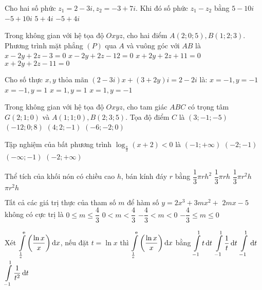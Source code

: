 \begin{ex}%
Cho hai số phức $z_1=2-3 i, z_2=-3+7 i$. Khi đó số phức $z_1-z_2$ bằng
\choice
{\True $5-10 i$}
{$-5+10 i$}
{$5+4 i$}
{$-5+4 i$}

\end{ex}
\begin{ex}%
Trong không gian với hệ tọa độ $O x y z$, cho hai điểm $A(2; 0; 5), B(1; 2; 3)$.
Phương trình mặt phẳng $(P)$ qua $A$ và vuông góc với $AB$ là
\choice
{$x-2 y+2 z-3=0$}
{\True $x-2 y+2 z-12=0$}
{$x+2 y+2 z+11=0$}
{$x+2 y+2 z-11=0$}

\end{ex}
\begin{ex}%
Cho số thực $x, y$ thỏa mãn $(2-3 i) x+(3+2 y) i=2-2 i$ là:
\choice
{$x=-1, y=-1$}
{$x=-1, y=1$}
{$x=1, y=1$}
{\True $x=1, y=-1$}

\end{ex}
\begin{ex}%
Trong không gian với hệ tọa độ $O x y z$, cho tam giác $ABC$ có trọng tâm $G(2; 1; 0)$ và $A(1; 1; 0), B(2; 3; 5)$. Tọa độ điểm $C$ là
\choice
{$(3;-1;-5)$}
{$(-12; 0; 8)$}
{$(4; 2;-1)$}
{\True $(-6;-2; 0)$}

\end{ex}
\begin{ex}%
Tập nghiệm của bất phương trình $\log_{\frac{\pi}{3}}(x+2)<0$ là
\choice
{$(-1;+\infty)$}
{\True $(-2;-1)$}
{$(-\infty;-1)$}
{$(-2;+\infty)$}

\end{ex}
\begin{ex}%
Thể tích của khối nón có chiều cao $h$, bán kính đáy $r$ bằng
\choice
{$\dfrac{1}{3} \pi r h^2$}
{$\dfrac{1}{3} \pi r h$}
{\True $\dfrac{1}{3} \pi r^2 h$}
{$\pi r^2 h$}

\end{ex}
\begin{ex}%
Tất cả các giá trị thực của tham số $m$ để hàm số $y=2 x^3+3 m x^2+$ $2 m x-5$ không có cực trị là
\choice
{\True $0\leq m \leq \dfrac{4}{3}$}
{$0<m<\dfrac{4}{3}$}
{$-\dfrac{4}{3}<m<0$}
{$-\dfrac{4}{3} \leq m \leq 0$}

\end{ex}
\begin{ex}%
Xét $\displaystyle\displaystyle\int\limits_{\frac{1}{{\rm e}}}^{{\rm e}}\left(\dfrac{\ln x}{x}\right) \mathrm{d} x$, nếu đặt $t=\ln x$ thì $\displaystyle\displaystyle\int\limits_{\frac{1}{{\rm e}}}^{{\rm e}}\left(\dfrac{\ln x}{x}\right) \mathrm{d} x$ bằng
\choice
{\True $\displaystyle\displaystyle\int\limits_{-1}^1 t \mathrm{\,d} t$}
{$\displaystyle\displaystyle\int\limits_{-1}^1 \dfrac{1}{t} \mathrm{\,d} t$}
{$\displaystyle\displaystyle\int\limits_{-1}^1 \mathrm{\,d} t$}
{$\displaystyle\displaystyle\int\limits_{-1}^1 \dfrac{1}{t^2} \mathrm{\,d} t$}

\end{ex}
